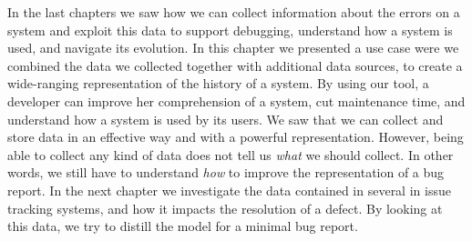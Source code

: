 In the last chapters we saw how we can collect information about the errors on a system and exploit this data to support debugging, understand how a system is used, and navigate its evolution.
In this chapter we presented a use case were we combined the data we collected together with additional data sources, to create a wide-ranging representation of the history of a system.
By using our tool, a developer can improve her comprehension of a system, cut maintenance time, and understand how a system is used by its users.
We saw that we can collect and store data in an effective way and with a powerful representation.
However, being able to collect any kind of data does not tell us \emph{what} we should collect.
In other words, we still have to understand \emph{how} to improve the representation of a bug report.
In the next chapter we investigate the data contained in several in issue tracking systems, and how it impacts the resolution of a defect.
By looking at this data, we try to distill the model for a minimal bug report.
